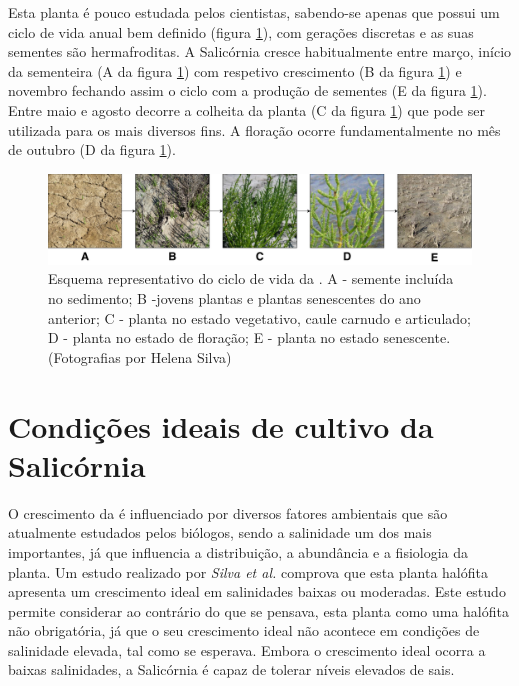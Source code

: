 Esta planta é pouco estudada pelos cientistas\cite{Figueroa1987}, sabendo-se apenas que possui um ciclo de vida anual bem definido (figura \ref{ciclodevida}), com gerações discretas e as suas sementes são hermafroditas\cite{Silva2007}. A Salicórnia cresce habitualmente entre março, início da sementeira (A da figura \ref{ciclodevida}) com respetivo crescimento (B da figura \ref{ciclodevida}) e novembro fechando assim o ciclo com a produção de sementes (E da figura \ref{ciclodevida}). Entre maio  e agosto decorre a colheita da planta\cite{RaquelPinto} (C da figura \ref{ciclodevida}) que pode ser utilizada para os mais diversos fins. A floração ocorre fundamentalmente no mês de outubro\cite{Figueroa1987} (D da figura \ref{ciclodevida}). 



	
\begin{figure}[!htb]
	\centering
	\includegraphics[width=\linewidth]{img/cap2-sali/ciclo/ciclodevida.pdf}
	\caption[Esquema representativo do ciclo de vida da \sr.]{Esquema representativo do ciclo de vida da \sr. A - semente incluída no sedimento; B -jovens plantas e plantas senescentes do ano anterior; C - planta no estado vegetativo, caule carnudo e articulado; D - planta no estado de floração; E - planta no estado senescente. (Fotografias por Helena Silva)}
	\label{ciclodevida}
\end{figure}



\section{Condições ideais de cultivo da Salicórnia}

O crescimento da \sr \space é influenciado por diversos fatores ambientais que são atualmente estudados pelos biólogos, sendo a salinidade um dos mais importantes, já que influencia a distribuição, a abundância e a fisiologia da planta. Um estudo realizado por \textit{Silva et al.}\cite{Silva2007} comprova que esta planta halófita apresenta um crescimento ideal em salinidades baixas ou moderadas. Este estudo permite considerar ao contrário do que se pensava, esta planta como uma halófita não obrigatória, já que o seu crescimento ideal não acontece em condições de salinidade elevada, tal como se esperava. Embora o crescimento ideal ocorra a baixas salinidades, a Salicórnia é capaz de tolerar níveis elevados de sais\cite{Rubio-Casal2003}.

